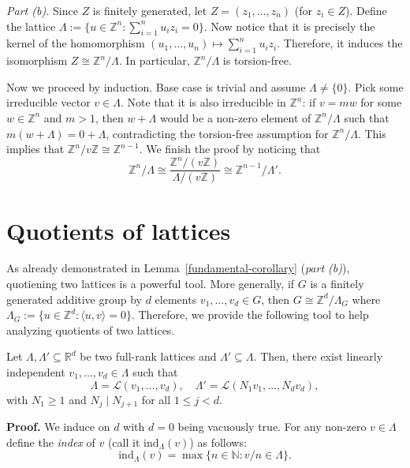 \documentclass{template-2}
\begin{document}
\textit{Part (b).} Since $Z$ is finitely generated, let $Z=(z_1,\dots,z_n)$ (for
$z_i \in Z$). Define the lattice $\Lambda := \{u \in \mathbb{Z}^n: \sum_{i=1}^n
u_iz_i = 0\}$. Now notice that it is precisely the kernel of the homomorphism
$(u_1,\dots,u_n) \mapsto \sum_{i=1}^n u_iz_i$. Therefore, it induces the
isomorphism $Z \cong \mathbb{Z}^n/\Lambda$. In particular,
$\mathbb{Z}^n/\Lambda$ is torsion-free. 

Now we proceed by induction. Base case is trivial and assume $\Lambda \neq
\{0\}$. Pick some irreducible vector $v \in \Lambda$. Note that it is also
irreducible in $\mathbb{Z}^n$: if $v=mw$ for some $w \in \mathbb{Z}^n$ and
$m>1$, then $w+\Lambda$ would be a non-zero element of $\mathbb{Z}^n/\Lambda$
such that $m(w+\Lambda)=0+\Lambda$, contradicting the torsion-free assumption
for $\mathbb{Z}^n/\Lambda$. This implies that $\mathbb{Z}^n/v\mathbb{Z} \cong
\mathbb{Z}^{n-1}$. We finish the proof by noticing that
\begin{equation*}
    \mathbb{Z}^n/\Lambda \cong \frac{\mathbb{Z}^n/(v\mathbb{Z})}{\Lambda/(v\mathbb{Z})} \cong \mathbb{Z}^{n-1}/\Lambda'.
\end{equation*}

\section{Quotients of lattices}

As already demonstrated in Lemma~\ref{fundamental-corollary} (\textit{part
(b)}), quotiening two lattices is a powerful tool. More generally, if $G$ is a
finitely generated additive group by $d$ elements $v_1,\dots,v_d \in G$, then $G
\cong \mathbb{Z}^d/\Lambda_G$ where $\Lambda_G := \{u \in \mathbb{Z}^d: \langle
u, v \rangle = 0\}$. Therefore, we provide the following tool to help analyzing
quotients of two lattices.

\begin{theorem}
    Let $\Lambda,\Lambda' \subseteq \mathbb{R}^d$ be two full-rank lattices and
    $\Lambda' \subseteq \Lambda$. Then, there exist linearly independent
    $v_1,\dots,v_d \in \Lambda$ such that
    \begin{equation*}
        \Lambda = \mathcal{L}(v_1,\dots,v_d), \quad \Lambda' = \mathcal{L}(N_1v_1,\dots,N_dv_d),
    \end{equation*}
    with $N_1 \geq 1$ and $N_j \mid N_{j+1}$ for all $1 \leq j < d$.
\end{theorem}

\textbf{Proof.} We induce on $d$ with $d=0$ being vacuously true. For any
non-zero $v \in \Lambda$ define the \textit{index} of $v$ (call it
$\text{ind}_{\Lambda}(v)$) as follows:
\begin{equation*}
    \text{ind}_{\Lambda}(v) = \max \{n \in \mathbb{N}: v/n \in \Lambda\}.
\end{equation*}
\end{document}
